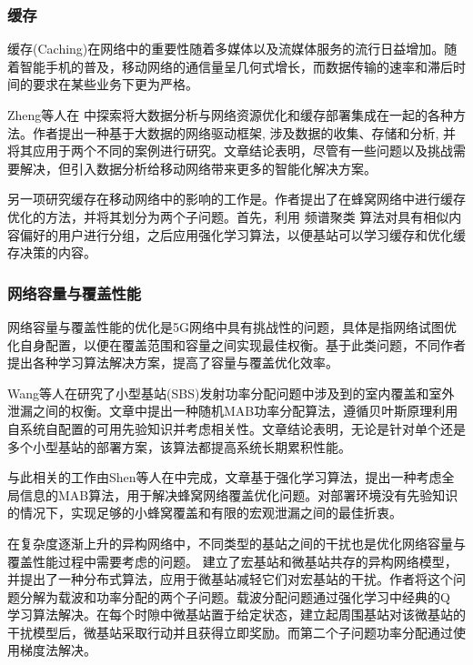 \documentclass{IEEEtran}
\begin{document}
\subsubsection{缓存}

缓存(Caching)在网络中的重要性随着多媒体以及流媒体服务的流行日益增加。随着智能手机的普及，移动网络的通信量呈几何式增长，而数据传输的速率和滞后时间的要求在某些业务下更为严格。

Zheng等人在\cite{Zheng2016} 中探索将大数据分析与网络资源优化和缓存部署集成在一起的各种方法。作者提出一种基于大数据的网络驱动框架, 涉及数据的收集、存储和分析, 并将其应用于两个不同的案例进行研究。文章结论表明，尽管有一些问题以及挑战需要解决，但引入数据分析给移动网络带来更多的智能化解决方案。


另一项研究缓存在移动网络中的影响的工作是\cite{ElBamby2014}。作者提出了在蜂窝网络中进行缓存优化的方法，并将其划分为两个子问题。首先，利用 频谱聚类 算法对具有相似内容偏好的用户进行分组，之后应用强化学习算法，以便基站可以学习缓存和优化缓存决策的内容。


\subsubsection{网络容量与覆盖性能}
网络容量与覆盖性能的优化是5G网络中具有挑战性的问题，具体是指网络试图优化自身配置，以便在覆盖范围和容量之间实现最佳权衡。基于此类问题，不同作者提出各种学习算法解决方案，提高了容量与覆盖优化效率。

Wang等人在\cite{Wang2017}研究了小型基站(SBS)发射功率分配问题中涉及到的室内覆盖和室外泄漏之间的权衡。文章中提出一种随机MAB功率分配算法，遵循贝叶斯原理利用自系统自配置的可用先验知识并考虑相关性。文章结论表明，无论是针对单个还是多个小型基站的部署方案，该算法都提高系统长期累积性能。

与此相关的工作由Shen等人在\cite{Shen2018}中完成，文章基于强化学习算法，提出一种考虑全局信息的MAB算法，用于解决蜂窝网络覆盖优化问题。对部署环境没有先验知识的情况下，实现足够的小蜂窝覆盖和有限的宏观泄漏之间的最佳折衷。

在复杂度逐渐上升的异构网络中，不同类型的基站之间的干扰也是优化网络容量与覆盖性能过程中需要考虑的问题。
\cite{Bennis2010}建立了宏基站和微基站共存的异构网络模型，并提出了一种分布式算法，应用于微基站减轻它们对宏基站的干扰。作者将这个问题分解为载波和功率分配的两个子问题。载波分配问题通过强化学习中经典的Q 学习算法解决。在每个时隙中微基站置于给定状态，建立起周围基站对该微基站的干扰模型后，微基站采取行动并且获得立即奖励。而第二个子问题功率分配通过使用梯度法解决。
\end{document}
